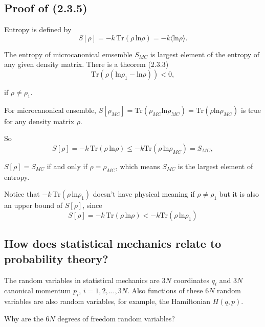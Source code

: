 \documentclass[10pt]{article}
\begin{document}
	\subsection{Proof of (2.3.5)}

	Entropy is defined by
	\begin{equation}
		S[\rho] = -k \, \mathrm{Tr}(\rho \, \mathrm{ln}\rho) = -k \langle\mathrm{ln} \rho \rangle.
	\end{equation}

	The entropy of microcanonical emsemble $S_{MC}$ is largest element of the entropy of any given density matrix. There is a theorem (2.3.3)
	\begin{equation}
		\mathrm{Tr}(\rho(\mathrm{ln} \rho_1 - \mathrm{ln} \rho)) < 0,
	\end{equation}

	if $\rho \neq \rho_1$.

	For microcanonical ensemble, $S[\rho_{MC}] = \mathrm{Tr}(\rho_{MC} \mathrm{ln} \rho_{MC}) = \mathrm{Tr}(\rho \mathrm{ln} \rho_{MC})$ is true for any density matrix $\rho$.

	So
	\begin{equation}
		S[\rho] = -k \, \mathrm{Tr}(\rho \, \mathrm{ln}\rho) \le -k \mathrm{Tr}(\rho \, \mathrm{ln}\rho_{MC}) = S_{MC},
	\end{equation}

	$S[\rho] = S_{MC}$ if and only if $\rho = \rho_{MC}$, which means $S_{MC}$ is the largest element of entropy.

	Notice that $-k \, \mathrm{Tr}(\rho \, \mathrm{ln}\rho_1)$ doesn't have physical meaning if $\rho \neq \rho_1$ but it is also an upper bound of $S[\rho]$, since
	\begin{equation}
		S[\rho] = -k \, \mathrm{Tr}(\rho \, \mathrm{ln}\rho) < -k \mathrm{Tr}(\rho \, \mathrm{ln}\rho_1)
	\end{equation}

	\subsection{How does statistical mechanics relate to probability theory?}

	The random variables in statistical mechanics are 3$N$ coordinates $q_i$ and 3$N$ canonical momentum $p_i$, $i = 1,2, \dots, 3N$. Also functions of these 6$N$ random variables are also random variables, for example, the Hamiltonian $H(q,p)$.

	Why are the 6$N$ degrees of freedom random variables?
\end{document}
